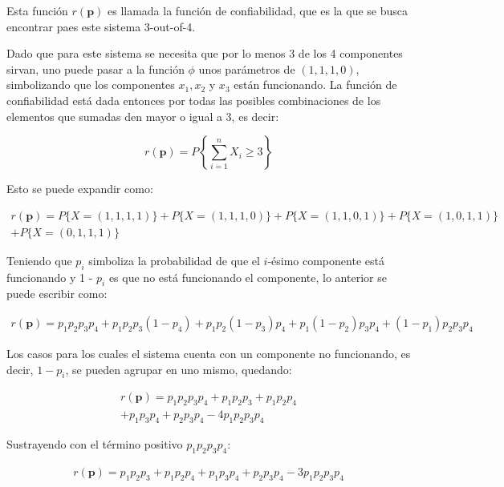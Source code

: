 \documentclass[12pt]{article}\usepackage[]{graphicx}\usepackage[]{xcolor}
\begin{document}
Esta función $r(\mathbf{p})$ es llamada la función de confiabilidad, que es la que se busca encontrar paes este sistema 3-out-of-4.

Dado que para este sistema se necesita que por lo menos 3 de los 4 componentes sirvan, uno puede pasar a la función $\phi$ unos parámetros de $(1, 1, 1, 0)$, simbolizando que los componentes $x_{1}, x_{2}$ y $ x_{3}$ están funcionando. La función de confiabilidad está dada entonces por todas las posibles combinaciones de los elementos que sumadas den mayor o igual a 3, es decir:

\[
r(\mathbf{p}) = P \left\{ \sum_{i=1}^{n} X_{i} \geq 3  \right\}
\]

Esto se puede expandir como:

\begin{multline*}
  r(\mathbf{p}) = P\{X = (1, 1, 1, 1) \} + P\{X = (1, 1, 1, 0) \} + P\{X = (1, 1, 0, 1) \} + P\{X = (1, 0, 1, 1) \} \\+ P\{X = (0, 1, 1, 1) \}
\end{multline*}

Teniendo que $p_{i}$ simboliza la probabilidad de que el $i$-ésimo componente está funcionando y 1 - $p_{i}$ es que no está funcionando el componente, lo anterior se puede escribir como:

\begin{multline*}
r(\mathbf{p}) = p_{1}p_{2}p_{3}p_{4} + p_{1}p_{2}p_{3}(1-p_{4}) + p_{1}p_{2}(1-p_{3})p_{4} + p_{1}(1-p_{2})p_{3}p_{4} + (1-p_{1})p_{2}p_{3}p_{4}  
\end{multline*}
 

Los casos para los cuales el sistema cuenta con un componente no funcionando, es decir, $1 - p_{i}$, se pueden agrupar en uno mismo, quedando:

\[
\begin{aligned}
  r(\mathbf{p}) = p_{1}p_{2}p_{3}p_{4} + p_{1}p_{2}p_{3} + p_{1}p_{2}p_{4}\\
  + p_{1}p_{3}p_{4} + p_{2}p_{3}p_{4} - 4p_{1}p_{2}p_{3}p_{4}  
\end{aligned}
\]

Sustrayendo con el término positivo $p_{1}p_{2}p_{3}p_{4}$:
\begin{tcolorbox}
\[
  \begin{aligned}
    r(\mathbf{p}) = p_{1}p_{2}p_{3} + p_{1}p_{2}p_{4} + p_{1}p_{3}p_{4}+ p_{2}p_{3}p_{4} - 3p_{1}p_{2}p_{3}p_{4}
  \end{aligned}
\]
\end{tcolorbox}
\end{document}
